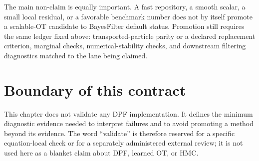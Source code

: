 The main non-claim is equally important.  A fast repository, a smooth scalar, a
small local residual, or a favorable benchmark number does not by itself promote a
scalable-OT candidate to BayesFilter default status.  Promotion still requires the
same ledger fixed above: transported-particle parity or a declared replacement
criterion, marginal checks, numerical-stability checks, and downstream filtering
diagnostics matched to the lane being claimed.

\section{Boundary of this contract}
\label{sec:bf-dpf-debug-boundary}

This chapter does not validate any DPF implementation.  It defines the
minimum diagnostic evidence needed to interpret failures and to avoid promoting
a method beyond its evidence.  The word ``validate'' is therefore reserved for a
specific equation-local check or for a separately administered external review;
it is not used here as a blanket claim about DPF, learned OT, or HMC.

\FloatBarrier
